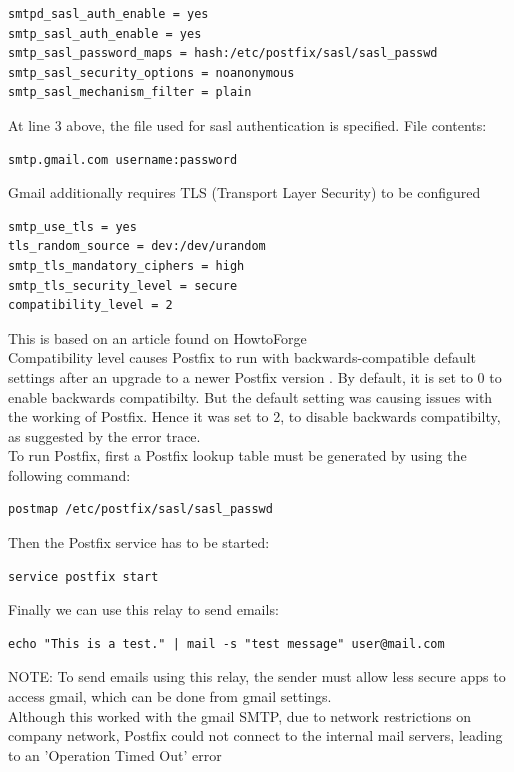 \begin{lstlisting}[style=ShellStyle]
smtpd_sasl_auth_enable = yes
smtp_sasl_auth_enable = yes
smtp_sasl_password_maps = hash:/etc/postfix/sasl/sasl_passwd
smtp_sasl_security_options = noanonymous
smtp_sasl_mechanism_filter = plain
\end{lstlisting}

At line 3 above, the file used for sasl authentication is specified. File contents:
\begin{lstlisting}[style=ShellStyle]
smtp.gmail.com username:password
\end{lstlisting}

Gmail additionally requires TLS (Transport Layer Security) to be configured
\begin{lstlisting}[style=ShellStyle]
smtp_use_tls = yes
tls_random_source = dev:/dev/urandom
smtp_tls_mandatory_ciphers = high
smtp_tls_security_level = secure
compatibility_level = 2
\end{lstlisting}
This is based on an article found on HowtoForge \cite{postfix}\\

Compatibility level causes Postfix to run with backwards-compatible default settings after an upgrade to a newer Postfix version \cite{compatibility}. By default, it is set to 0 to enable backwards compatibilty. But the default setting was causing issues with the working of Postfix. Hence it was set to 2, to disable backwards compatibilty, as suggested by the error trace.\\

To run Postfix, first a Postfix lookup table must be generated by using the following command:
\begin{lstlisting}[style=ShellStyle]
postmap /etc/postfix/sasl/sasl_passwd
\end{lstlisting} 
Then the Postfix service has to be started:
\begin{lstlisting}[style=ShellStyle]
service postfix start
\end{lstlisting}
Finally we can use this relay to send emails:
\begin{lstlisting}[style=ShellStyle]
echo "This is a test." | mail -s "test message" user@mail.com
\end{lstlisting}
NOTE: To send emails using this relay, the sender must allow less secure apps to access gmail, which can be done from gmail settings.\\

Although this worked with the gmail SMTP, due to network restrictions on company network, Postfix could not connect to the internal mail servers, leading to an 'Operation Timed Out' error\\

